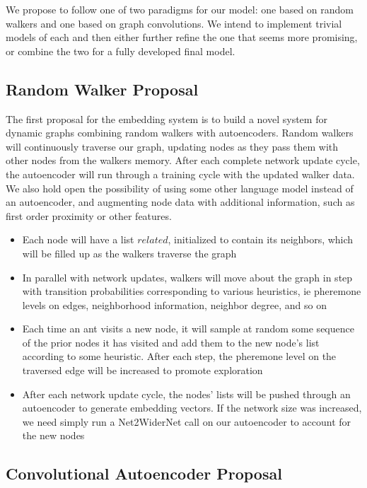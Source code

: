 \documentclass[10pt]{article}
\begin{document}
We propose to follow one of two paradigms for our model: one based on random walkers and one based on graph convolutions. We intend to implement trivial models of each and then either further refine the one that seems more promising, or combine the two for a fully developed final model. \\

\subsection{Random Walker Proposal}

The first proposal for the embedding system is to build a novel system for dynamic graphs combining random walkers with autoencoders. Random walkers will continuously traverse our graph, updating nodes as they pass them with other nodes from the walkers memory. After each complete network update cycle, the autoencoder will run through a training cycle with the updated walker data. We also hold open the possibility of using some other language model instead of an autoencoder, and augmenting node data with additional information, such as first order proximity or other features. 
\begin{itemize}
\item Each node will have a list $related$, initialized to contain its neighbors, which will be filled up as the walkers traverse the graph
\item In parallel with network updates, walkers will move about the graph in step with transition probabilities corresponding to various heuristics, ie pheremone levels on edges, neighborhood information, neighbor degree, and so on
\item Each time an ant visits a new node, it will sample at random some sequence of the prior nodes it has visited and add them to the new node's list according to some heuristic. After each step, the pheremone level on the traversed edge will be increased to promote exploration
\item After each network update cycle, the nodes' lists will be pushed through an autoencoder to generate embedding vectors. If the network size was increased, we need simply run a Net2WiderNet \cite{chen2015net2net} call on our autoencoder to account for the new nodes 
\end{itemize} 

\subsection{Convolutional Autoencoder Proposal}
\end{document}
